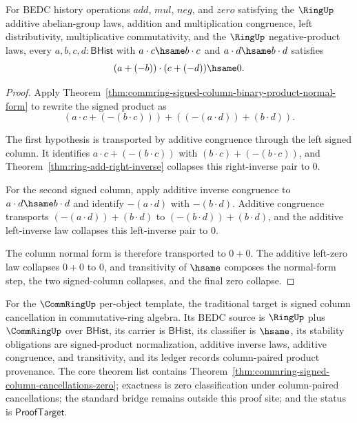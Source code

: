 \begin{theorem}
\label{thm:commring-signed-column-cancellations-zero}
For BEDC history operations $add$, $mul$, $neg$, and $zero$ satisfying the
$\RingUp$ additive abelian-group laws, addition and multiplication
congruence, left distributivity, multiplicative commutativity, and the
$\RingUp$ negative-product laws, every $a,b,c,d : \mathsf{BHist}$ with
$a\cdot c\hsame b\cdot c$ and $a\cdot d\hsame b\cdot d$ satisfies
$$
(a+(-b))\cdot(c+(-d))\hsame0.
$$
\end{theorem}
\begin{proof}
Apply Theorem~\ref{thm:commring-signed-column-binary-product-normal-form} to
rewrite the signed product as
$$
(a\cdot c+(-(b\cdot c)))+((-(a\cdot d))+(b\cdot d)).
$$

The first hypothesis is transported by additive congruence through the left
signed column. It identifies $a\cdot c+(-(b\cdot c))$ with
$(b\cdot c)+(-(b\cdot c))$, and Theorem~\ref{thm:ring-add-right-inverse}
collapses this right-inverse pair to $0$.

For the second signed column, apply additive inverse congruence to
$a\cdot d\hsame b\cdot d$ and identify $-(a\cdot d)$ with $-(b\cdot d)$.
Additive congruence transports $(-(a\cdot d))+(b\cdot d)$ to
$(-(b\cdot d))+(b\cdot d)$, and the additive left-inverse law collapses this
left-inverse pair to $0$.

The column normal form is therefore transported to $0+0$. The additive
left-zero law collapses $0+0$ to $0$, and transitivity of $\hsame$ composes
the normal-form step, the two signed-column collapses, and the final zero
collapse.
\end{proof}

For the $\CommRingUp$ per-object template, the traditional target is signed
column cancellation in commutative-ring algebra. Its BEDC source is $\RingUp$
plus $\CommRingUp$ over $\mathsf{BHist}$, its carrier is $\mathsf{BHist}$, its
classifier is $\hsame$, its stability obligations are signed-product
normalization, additive inverse laws, additive congruence, and transitivity, and
its ledger records column-paired product provenance. The core theorem list
contains Theorem~\ref{thm:commring-signed-column-cancellations-zero}; exactness
is zero classification under column-paired cancellations; the standard bridge
remains outside this proof site; and the status is $\mathsf{ProofTarget}$.

